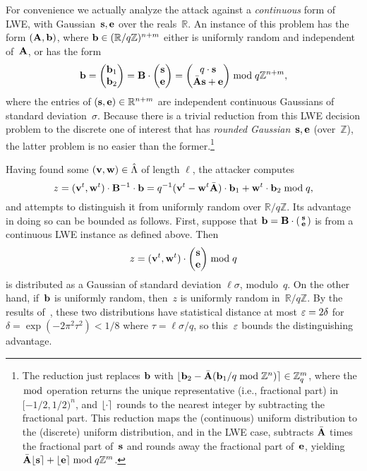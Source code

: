 \documentclass{iacrcc}
\begin{document}
For convenience we actually analyze the attack against a
\emph{continuous} form of LWE, with Gaussian~$\mathbf{s}, \mathbf{e}$ over the
reals~$\mathbb{R}$. An instance of this problem has the form
$(\mathbf{A}, \mathbf{b})$, where $\mathbf{b} \in (\mathbb{R}/q\mathbb{Z})^{n + m}$
either is uniformly random and independent of~$\mathbf{A}$, or has the form
\[
  \mathbf{b} =
  \begin{pmatrix}
    \mathbf{b}_{1} \\ \mathbf{b}_{2}
  \end{pmatrix}
  = \mathbf{B} \cdot
  \begin{pmatrix}
    \mathbf{s} \\ \mathbf{e}
  \end{pmatrix} =
  \begin{pmatrix}
    q \cdot \mathbf{s} \\ \bar {\mathbf{A}} \mathbf{s} + \mathbf{e}
  \end{pmatrix}
  \bmod q \mathbb{Z}^{n + m} , \] where the entries of
$(\mathbf{s}, \mathbf{e}) \in \mathbb{R}^{n + m}$ are independent continuous
Gaussians of standard deviation~$\sigma$. Because there is a trivial
reduction from this LWE decision problem to the discrete one of
interest that has \emph{rounded Gaussian}~$\mathbf{s}, \mathbf{e}$
(over~$\mathbb{Z}$), the latter problem is no easier than the
former.\footnote{The reduction just replaces $\mathbf{b}$ with
  $\lfloor\mathbf{b}_{2} - \bar {\mathbf{A}} (\mathbf{b}_{1}/q \bmod \mathbb{Z}^{n})\rceil \in
  \mathbb{Z}_{q}^{m}$, where the $\bmod$ operation returns the unique
  representative (i.e., fractional part) in $[-1/2, 1/2)^{n}$, and
  $\lfloor\cdot\rceil$ rounds to the nearest integer by subtracting the
  fractional part. This reduction maps the (continuous) uniform
  distribution to the (discrete) uniform distribution, and in the LWE
  case, subtracts $\bar {\mathbf{A}}$ times the fractional part of~$\mathbf{s}$ and
  rounds away the fractional part of~$\mathbf{e}$, yielding
  $\bar {\mathbf{A}} \lfloor\mathbf{s}\rceil + \lfloor\mathbf{e}\rceil \bmod q\mathbb{Z}^{m}$.}

Having found some $(\mathbf{v},\mathbf{w}) \in \hat\Lambda$ of length $\ell$, the
attacker computes
\[ z = (\mathbf{v}^{t}, \mathbf{w}^{t}) \cdot \mathbf{B}^{-1} \cdot \mathbf{b} = q^{-1}
  (\mathbf{v}^{t} - \mathbf{w}^{t} \bar {\mathbf{A}}) \cdot \mathbf{b}_{1} + \mathbf{w}^{t} \cdot
  \mathbf{b}_{2} \bmod q , \] and attempts to distinguish it from uniformly
random over $\mathbb{R}/q\mathbb{Z}$. Its advantage in doing so can be
bounded as follows. First, suppose that $\mathbf{b} = \mathbf{B} \cdot \left(
  \begin{smallmatrix}
    \mathbf{s} \\ \mathbf{e}
  \end{smallmatrix}
\right)$ is from a continuous LWE instance as defined above. Then
\[ z = (\mathbf{v}^{t}, \mathbf{w}^{t}) \cdot
  \begin{pmatrix}
    \mathbf{s} \\ \mathbf{e}
  \end{pmatrix} \bmod q \] is distributed as a Gaussian of standard
deviation $\ell \sigma$, modulo~$q$. On the other hand, if~$\mathbf{b}$ is
uniformly random, then~$z$ is uniformly random
in~$\mathbb{R}/q\mathbb{Z}$. By the results
of~\cite{DBLP:journals/siamcomp/MicciancioR07}, these two
distributions have statistical distance at most $\varepsilon = 2\delta$ for
$\delta = \exp(-2\pi^2 \tau^2) < 1/8$ where $\tau = \ell \sigma / q$,
so this~$\varepsilon$ bounds the distinguishing advantage.
\end{document}
